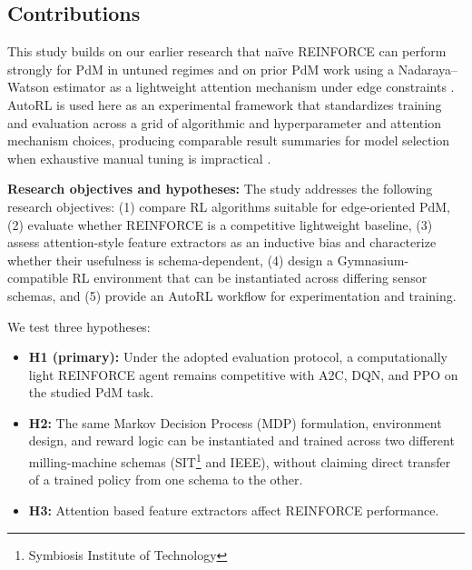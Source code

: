 \documentclass[sn-vancouver-num]{sn-jnl}%
\begin{document}
\subsection{Contributions}

This study builds on our earlier research that na\"{i}ve \textsc{REINFORCE} can perform strongly for PdM in untuned regimes \cite{Siraskar2025} and on prior PdM work using a Nadaraya--Watson estimator as a lightweight attention mechanism under edge constraints \cite{Siraskar2024}. AutoRL is used here as an experimental framework that standardizes training and evaluation across a grid of algorithmic and hyperparameter and attention mechanism choices, producing comparable result summaries for model selection when exhaustive manual tuning is impractical \cite{Schwartz2020, Strubell2019, Faust2019, Mussi2022}.

\textbf{Research objectives and hypotheses:}
The study addresses the following research objectives: (1) compare RL algorithms suitable for edge-oriented PdM, (2) evaluate whether \textsc{REINFORCE} is a competitive lightweight baseline, (3) assess attention-style feature extractors as an inductive bias and characterize whether their usefulness is schema-dependent, (4) design a Gymnasium-compatible RL environment that can be instantiated across differing sensor schemas, and (5) provide an AutoRL workflow for experimentation and training.

We test three hypotheses:
\begin{itemize}
    \item \textbf{H1 (primary):} Under the adopted evaluation protocol, a computationally light \textsc{REINFORCE} agent remains competitive with \textsc{A2C}, \textsc{DQN}, and \textsc{PPO} on the studied PdM task.
    \item \textbf{H2:} The same Markov Decision Process (MDP) formulation, environment design, and reward logic can be instantiated and trained across two different milling-machine schemas (SIT\footnote{Symbiosis Institute of Technology} and IEEE), without claiming direct transfer of a trained policy from one schema to the other.
    \item \textbf{H3:} Attention based feature extractors affect \textsc{REINFORCE} performance.
\end{itemize}
\end{document}

